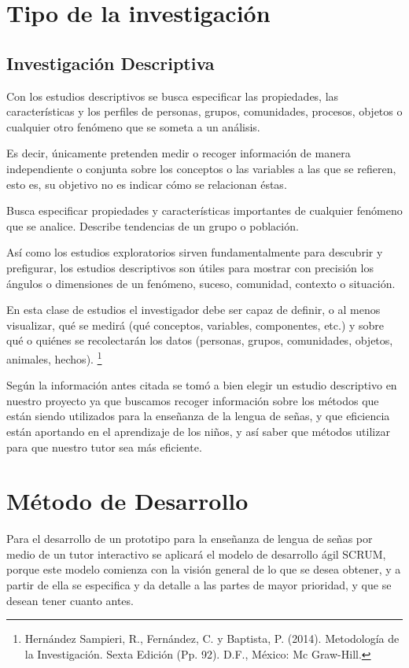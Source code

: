 \documentclass[12pt]{report}%
\begin{document}
\section{Tipo de la investigación}
\subsection{Investigación Descriptiva}
Con los estudios descriptivos se busca especificar las propiedades, las características y los perfiles de personas, grupos, comunidades, procesos, objetos o cualquier otro fenómeno que se someta a un análisis. 

Es decir, únicamente pretenden medir o recoger información de manera independiente o conjunta sobre los conceptos o las variables a las que se refieren, esto es, su objetivo no es indicar cómo se relacionan éstas.

Busca especificar propiedades y características importantes de cualquier fenómeno que se analice. Describe tendencias de un grupo o población.

Así como los estudios exploratorios sirven fundamentalmente para descubrir y prefigurar, los estudios descriptivos son útiles para mostrar con precisión los ángulos o dimensiones de un fenómeno, suceso, comunidad, contexto o situación. 

En esta clase de estudios el investigador debe ser capaz de definir, o al menos visualizar, qué se medirá (qué conceptos, variables, componentes, etc.) y sobre qué o quiénes se recolectarán los datos (personas, grupos, comunidades, objetos, animales, hechos). \footnote{Hernández Sampieri, R., Fernández, C. y  Baptista, P. (2014). Metodología de la Investigación. Sexta Edición (Pp. 92). D.F., México: Mc Graw-Hill.}   

Según la información antes citada se tomó a bien elegir un estudio descriptivo en nuestro proyecto ya que buscamos recoger información sobre los métodos que están siendo utilizados para la enseñanza de la lengua de señas, y que eficiencia están aportando en el aprendizaje de los niños, y así saber que métodos utilizar para que nuestro tutor sea más eficiente.

\newpage
\section{Método de Desarrollo}
Para el desarrollo de un prototipo para la enseñanza de lengua de señas por medio de un tutor interactivo se aplicará el modelo de desarrollo ágil SCRUM, porque este modelo comienza con la visión general de lo que se desea obtener, y a partir de ella se especifica y da detalle a las partes de mayor prioridad, y que se desean tener cuanto antes.
\end{document}
